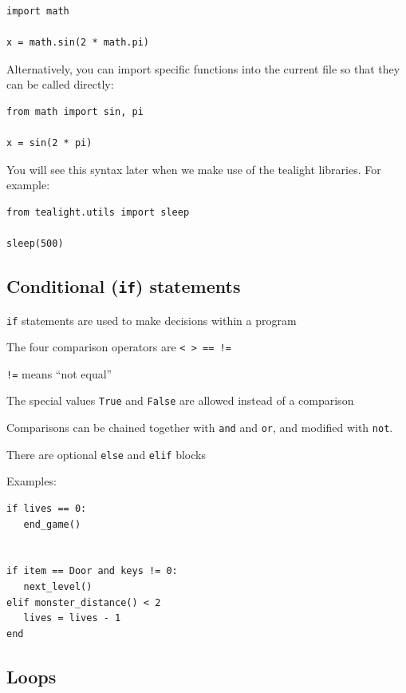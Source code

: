 \documentclass[12pt,a4paper,twoside]{article}
\renewcommand{\_}{\texttt{\symbol{95}}}
\begin{document}
\begin{verbatim}
import math

x = math.sin(2 * math.pi)
\end{verbatim}

Alternatively, you can import specific functions into the current file so that they can be called directly:

\begin{verbatim}
from math import sin, pi

x = sin(2 * pi)
\end{verbatim}

You will see this syntax later when we make use of the tealight libraries. For example:

\begin{verbatim}
from tealight.utils import sleep

sleep(500)
\end{verbatim}


\subsection{Conditional (\texttt{if}) statements}

\begin{bulletlist}
\item \verb^if^ statements are used to make decisions within a program
\item The four comparison operators are \verb^< > == !=^
\item \verb^!=^ means ``not equal''
\item The special values \verb^True^ and \verb^False^ are allowed
      instead of a comparison
\item Comparisons can be chained together with \verb^and^ and \verb^or^, and modified with \verb^not^.
\item There are optional \verb^else^ and \verb^elif^ blocks
\end{bulletlist}

Examples:
\begin{verbatim}
if lives == 0:
   end_game()


if item == Door and keys != 0:
   next_level()
elif monster_distance() < 2
   lives = lives - 1
end
\end{verbatim}

\subsection{Loops}
\end{document}
